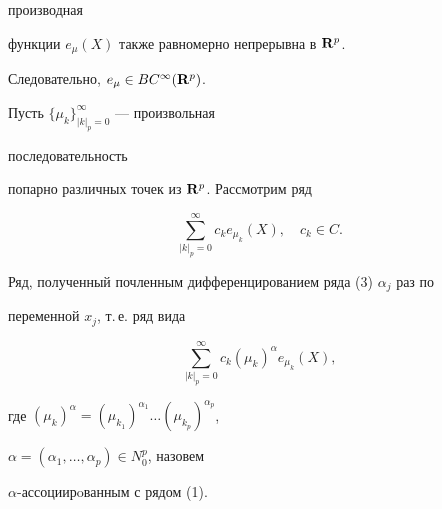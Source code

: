 производная


функции $e_{\mu}(X)$ также равномерно непрерывна в ${\bold R}^p$.


Следовательно, $e_{\mu}\in BC^{\infty}({\bold R}^p)$.





Пусть $\{\mu_k\}^{\infty}_{|k|_p=0}$ --- произвольная


последовательность


попарно различных точек из ${\bold R}^p$. Рассмотрим ряд


\begin{equation}


\sum^{\infty}_{|k|_p=0}c_ke_{\mu_k}(X),\quad c_k\in C.


\end{equation}


Ряд, полученный почленным дифференцированием ряда (3) $\alpha_j$ раз по


переменной $x_j$, т.\,е. ряд вида


\begin{equation}


\sum^{\infty}_{|k|_p=0}c_k(\mu_k)^{\alpha}e_{\mu_k}(X),


\end{equation}


где $(\mu_k)^{\alpha}=(\mu_{k_1})^{\alpha_1}\dotsc (\mu_{k_p})^{\alpha_p}$,


$\alpha=(\alpha_1,\dotsc,\alpha_p)\in N_0^p$, назовем


$\alpha$-ассоциирoванным с рядом (1).








